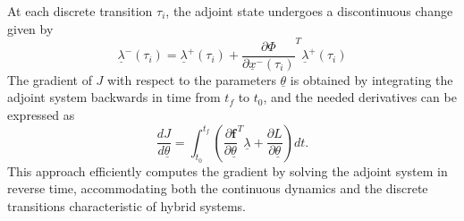 \documentclass{article}
\begin{document}
At each discrete transition \(\tau_i\), the adjoint state undergoes a discontinuous change given by
\[
\underline{\lambda}^-(\tau_i) = \underline{\lambda}^+(\tau_i) + \frac{\partial \Phi}{\partial \underline{x}^-(\tau_i)}^T \underline{\lambda}^+(\tau_i)
\]
The gradient of \(J\) with respect to the parameters \(\underline{\theta}\) is obtained by integrating the adjoint system backwards in time from \(t_f\) to \(t_0\), and the needed derivatives can be expressed as
\[
\frac{dJ}{d\underline{\theta}} = \int_{t_0}^{t_f} \left( \frac{\partial \boldsymbol{f}}{\partial \underline{\theta}}^T \underline{\lambda} + \frac{\partial L}{\partial \underline{\theta}} \right) dt .
\]
This approach efficiently computes the gradient by solving the adjoint system in reverse time, accommodating both the continuous dynamics and the discrete transitions characteristic of hybrid systems.
\end{document}
